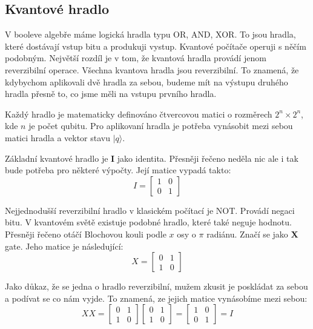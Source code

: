 \documentclass[11pt]{article}
\begin{document}
\subsection{Kvantové hradlo}
V booleve algebře máme logická hradla typu OR, AND, XOR.
To jsou hradla, které dostávají vstup bitu a produkuji vystup.
Kvantové počítače operuji s něčím podobným.
Největší rozdíl je v tom, že kvantová hradla provádí jenom reverzibilní operace.
Všechna kvantova hradla jsou reverzibilní.
To znamená, že kdybychom aplikovali dvě hradla za sebou, budeme mít na výstupu druhého hradla přesně to, co jsme měli na vstupu prvního hradla.
\par Každý hradlo je matematicky definováno čtvercovou matici o rozměrech $2^n \times 2^n$, kde $n$ je počet qubitu.
Pro aplikovaní hradla je potřeba vynásobit mezi sebou matici hradla a vektor stavu $|q\rangle$.
\par Základní kvantové hradlo je \textbf{I} jako identita.
Přesněji řečeno neděla nic ale i tak bude potřeba pro některé výpočty.
Její matice vypadá takto:
$$I = \begin{bmatrix}
        1 & 0 \\
        0 & 1
    \end{bmatrix}$$
\par Nejjednodušší reverzibilní hradlo v klasickém počítací je NOT.
Provádí negaci bitu. V kvantovém světě existuje podobné hradlo, které také neguje hodnotu.
Přesněji řečeno otáčí Blochovou kouli podle $x$ osy o $\pi$ radiánu. Značí se jako \textbf{X} gate.
Jeho matice je následující:
$$X = \begin{bmatrix}
        0 & 1 \\
        1 & 0
    \end{bmatrix}$$
\par Jako důkaz, že se jedna o hradlo reverzibilní, mužem zkusit je poskládat za sebou a podívat se co nám vyjde.
To znamená, ze jejich matice vynásobíme mezi sebou:
$$XX = \begin{bmatrix}
        0 & 1 \\
        1 & 0
    \end{bmatrix}\begin{bmatrix}
        0 & 1 \\
        1 & 0
    \end{bmatrix} = \begin{bmatrix}
        1 & 0 \\
        0 & 1
    \end{bmatrix} = I$$
\end{document}
